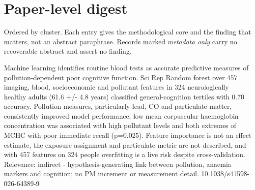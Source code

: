 \documentclass[10pt]{article}
\providecommand{\FIGDIR}{fig}
\begin{document}
\IfFileExists{\FIGDIR/extra_figs.tex}{}{}



\par{}\baselineskip{}\baselineskip
\section*{\sffamily\bfseries\color{Deep}Paper-level digest}
\vspace{-1.5mm}{\color{Amber}\rule{\linewidth}{1.1pt}}\vspace{2.5mm}

{\fontsize{7.4}{9}\selectfont\color{Slate}Ordered by cluster. Each entry gives the
methodological core and the finding that matters, not an abstract paraphrase. Records
marked \textit{metadata only} carry no recoverable abstract and assert no finding.\par}


{Machine learning identifies routine blood tests as accurate predictive measures of pollution-dependent poor cognitive function.}
{Sci Rep}
{Random forest over 457 imaging, blood, socioeconomic and pollutant features in 324 neurologically healthy adults (61.6 +/- 4.8 years) classified general-cognition tertiles with 0.70 accuracy. Pollution measures, particularly lead, CO and particulate matter, consistently improved model performance; low mean corpuscular haemoglobin concentration was associated with high pollutant levels and both extremes of MCHC with poor immediate recall (p=0.025). Feature importance is not an effect estimate, the exposure assignment and particulate metric are not described, and with 457 features on 324 people overfitting is a live risk despite cross-validation. Relevance: indirect - hypothesis-generating link between pollution, anaemia markers and cognition; no PM increment or measurement detail.}
{10.1038/s41598-026-64389-9}
\end{document}
